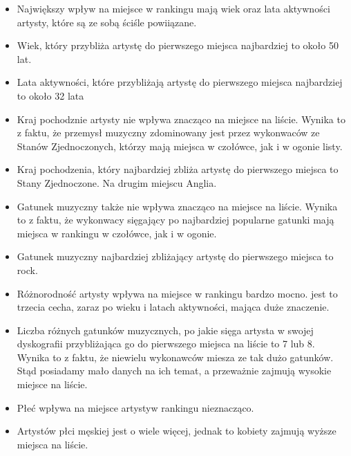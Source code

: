 \documentclass[12pt, letterpaper]{article}
\begin{document}
\begin{itemize}
    \item Największy wpływ na miejsce w rankingu mają wiek oraz lata aktywności artysty, które są ze sobą ściśle powiiązane.
    \item Wiek, który przybliża artystę do pierwszego miejsca najbardziej to około 50 lat.
    \item Lata aktywności, które przybliżają artystę do pierwszego miejsca najbardziej to około 32 lata
    \item Kraj pochodznie artysty nie wpływa znacząco na miejsce na liście. Wynika to z faktu, że przemysł muzyczny zdominowany jest przez wykonwaców ze Stanów Zjednoczonych, którzy mają miejsca w czołówce, jak i w ogonie listy.
    \item Kraj pochodzenia, który najbardziej zbliża artystę do pierwszego miejsca to Stany Zjednoczone. Na drugim miejscu Anglia.
    \item Gatunek muzyczny także nie wpływa znacząco na miejsce na liście. Wynika to z faktu, że wykonwacy sięgający po najbardziej popularne gatunki mają miejsca w rankingu w czołówce, jak i w ogonie.
    \item Gatunek muzyczny najbardziej zbliżający artystę do pierwszego miejsca to rock.
    \item Różnorodność artysty wpływa na miejsce w rankingu bardzo mocno. jest to trzecia cecha, zaraz po wieku i latach aktywności, mająca duże znaczenie.
    \item Liczba różnych gatunków muzycznych, po jakie sięga artysta w swojej dyskografii przybliżająca go do pierwszego miejsca na liście to 7 lub 8. Wynika to z faktu, że niewielu wykonawców miesza ze tak dużo gatunków. Stąd posiadamy mało danych na ich temat, a przeważnie zajmują wysokie miejsce na liście.
    \item Płeć wpływa na miejsce artystyw rankingu nieznacząco. 
    \item Artystów płci męskiej jest o wiele więcej, jednak to kobiety zajmują wyższe miejsca na liście. 
\end{itemize}
\end{document}
